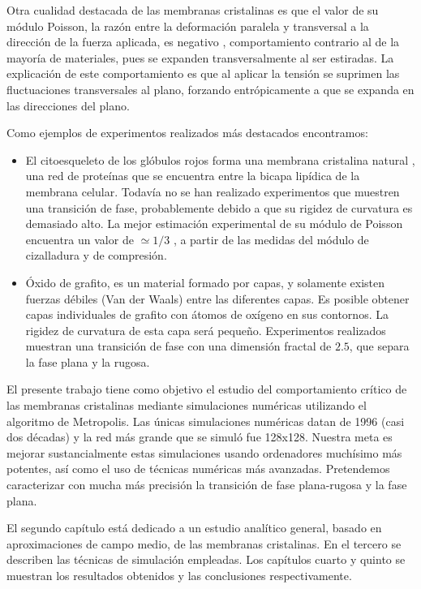 Otra cualidad destacada de las membranas cristalinas es que el valor de su módulo Poisson,
la razón entre la deformación paralela y transversal a la dirección de 
la fuerza aplicada, es negativo \cite{Bowick_poisson_ratio}, comportamiento
contrario al de la mayoría de materiales, pues se expanden transversalmente al
ser estiradas. La explicación de este comportamiento es que al aplicar la
tensión se suprimen las fluctuaciones transversales al plano, forzando
entrópicamente a que se expanda en las direcciones del plano. 

Como ejemplos de experimentos realizados más destacados encontramos:
\begin{itemize}
\item El citoesqueleto de los glóbulos rojos forma una membrana cristalina
  natural \cite{Boal_MCell}, una red de proteínas que se encuentra entre la
  bicapa  lipídica de la membrana celular. Todavía no se han
  realizado experimentos que muestren una transición de fase, probablemente
  debido a que su rigidez de curvatura es demasiado alto. La mejor estimación experimental de su
  módulo de Poisson encuentra un valor de $\simeq 1/3$ \cite{Discher:Molecular}, a partir de las
  medidas del módulo de cizalladura y de compresión.
\item Óxido de grafito, es un material formado por capas, y solamente existen
  fuerzas débiles (Van der Waals) entre las diferentes capas. Es posible
  obtener capas individuales de grafito con átomos de oxígeno en sus
  contornos. La rigidez de curvatura de esta capa será pequeño. Experimentos
  realizados \cite{Hwa:Conformation} muestran una transición de fase con una dimensión fractal de
  $2.5$, que separa la fase plana y la rugosa.
\end{itemize}

El presente trabajo tiene como objetivo el estudio del comportamiento crítico de
las membranas cristalinas mediante simulaciones numéricas utilizando el
algoritmo de Metropolis. Las únicas simulaciones numéricas datan de 1996 (casi
dos décadas) \cite{Bowick_flat_phase} y la red más grande que se simuló fue
128x128. Nuestra meta es mejorar sustancialmente estas simulaciones usando
ordenadores muchísimo más potentes, así como el uso de técnicas 
numéricas más avanzadas. Pretendemos caracterizar con mucha más precisión la
transición de fase plana-rugosa y la fase plana. 

El segundo capítulo está dedicado a un estudio analítico general, basado en
aproximaciones de campo medio, de las membranas
cristalinas. En el tercero se describen las técnicas de simulación
empleadas. Los capítulos cuarto y quinto se muestran los resultados obtenidos
y las conclusiones respectivamente.




  

